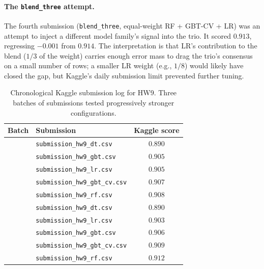 \documentclass[12pt]{article}
\begin{document}
	\paragraph{The \texttt{blend\_three} attempt.} The fourth submission (\texttt{blend\_three}, equal-weight RF + GBT-CV + LR) was an attempt to inject a different model family's signal into the trio. It scored $0.913$, regressing $-0.001$ from $0.914$. The interpretation is that LR's contribution to the blend ($1/3$ of the weight) carries enough error mass to drag the trio's consensus on a small number of rows; a smaller LR weight (e.g., $1/8$) would likely have closed the gap, but Kaggle's daily submission limit prevented further tuning.

	\begin{table}[H]
		\centering
		\caption{Chronological Kaggle submission log for HW9. Three batches of submissions tested progressively stronger configurations.}\label{tab:kaggle-log}
		\begin{tabular}{clc}
			\toprule
			Batch & Submission & Kaggle score \\
			\midrule
			      & \texttt{submission\_hw9\_dt.csv}             & $0.890$ \\
			      & \texttt{submission\_hw9\_gbt.csv}            & $0.905$ \\
			      & \texttt{submission\_hw9\_lr.csv}             & $0.905$ \\
			      & \texttt{submission\_hw9\_gbt\_cv.csv}        & $0.907$ \\
			      & \texttt{submission\_hw9\_rf.csv}             & $0.908$ \\
			\midrule
			      & \texttt{submission\_hw9\_dt.csv}             & $0.890$ \\
			      & \texttt{submission\_hw9\_lr.csv}             & $0.903$ \\
			      & \texttt{submission\_hw9\_gbt.csv}            & $0.906$ \\
			      & \texttt{submission\_hw9\_gbt\_cv.csv}        & $0.909$ \\
			      & \texttt{submission\_hw9\_rf.csv}             & $0.912$ \\

\end{tabular}
\end{table}
\end{document}
